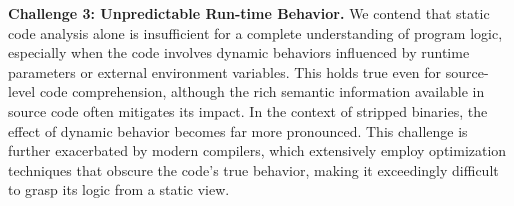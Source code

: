 \documentclass[acmsmall,screen,review,anonymous]{acmart} %
\begin{document}

\textbf{Challenge 3: Unpredictable Run-time Behavior.}
We contend that static code analysis alone is insufficient for a complete understanding of program logic, especially when the code involves dynamic behaviors influenced by runtime parameters or external environment variables. This holds true even for source-level code comprehension, although the rich semantic information available in source code often mitigates its impact. In the context of stripped binaries, the effect of dynamic behavior becomes far more pronounced. This challenge is further exacerbated by modern compilers, which extensively employ optimization techniques that obscure the code's true behavior, making it exceedingly difficult to grasp its logic from a static view\cite{sig_meet_opt}.
\end{document}
